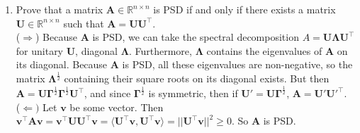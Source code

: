 \documentclass{article}
\begin{document}
\begin{enumerate}[label=\arabic*.]
\item Prove that a matrix $\mathbf{A} \in \mathbb{R}^{n \times n}$ is PSD if and only if there exists a matrix $\mathbf{U} \in \mathbb{R}^{n \times n}$ such that $\mathbf{A} = \mathbf{UU^{\top}}$. \\
{\color{blue} ($\Rightarrow$) Because $\mathbf{A}$ is PSD, we can take the spectral decomposition $A = \mathbf{U\Lambda U^{\top}}$ for unitary $\mathbf{U}$, diagonal $\mathbf{\Lambda}$. Furthermore, $\mathbf{\Lambda}$ contains the eigenvalues of $\mathbf{A}$ on its diagonal. Because $\mathbf{A}$ is PSD, all these eigenvalues are non-negative, so the matrix $\mathbf{\Lambda}^{\frac{1}{2}}$ containing their square roots on its diagonal exists. But then $\mathbf{A} = \mathbf{U\Gamma}^{\frac{1}{2}}\mathbf{\Gamma}^{\frac{1}{2}}\mathbf{U^{\top}}$, and since $\mathbf{\Gamma}^\frac{1}{2}$ is symmetric, then if $\mathbf{U' = U\Gamma}^{\frac{1}{2}}$, $\mathbf{A = U'U'^{\top}}$. \\
($\Leftarrow)$ Let $\mathbf{v}$ be some vector. Then $\mathbf{v^{\top}Av = v^{\top}UU^{\top}v = \langle U^{\top}v, U^{\top}v \rangle = ||U^{\top}v}||^2 \geq 0$. So $\mathbf{A}$ is PSD. }
\end{enumerate}
\end{document}

